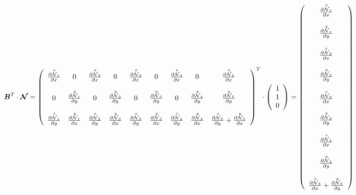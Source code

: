 \[
{\bm B}^T \cdot {\bm {{\mathcal{N}}}} 
=
\left(
\begin{array}{cccccccccccccccccc}
\frac{\partial \overset{x}{{\mathcal{N}}}_1}{\partial x} & 0 &
\frac{\partial \overset{x}{{\mathcal{N}}}_2}{\partial x} & 0 &
\frac{\partial \overset{x}{{\mathcal{N}}}_3}{\partial x} & 0 &
\frac{\partial \overset{x}{{\mathcal{N}}}_4}{\partial x} & 0 &
\frac{\partial \overset{x}{{\mathcal{N}}}_5}{\partial x} 
\\ \\
0 & \frac{\partial \overset{\tiny y}{{\mathcal{N}}}_1}{\partial y} & 
0 & \frac{\partial \overset{\tiny y}{{\mathcal{N}}}_2}{\partial y} & 
0 & \frac{\partial \overset{\tiny y}{{\mathcal{N}}}_3}{\partial y} & 
0 & \frac{\partial \overset{\tiny y}{{\mathcal{N}}}_4}{\partial y} & 
\frac{\partial \overset{\tiny y}{{\mathcal{N}}}_5}{\partial y} 
\\ \\ 
\frac{\partial \overset{\tiny x}{{\mathcal{N}}}_1}{\partial y} &  
\frac{\partial \overset{\tiny y}{{\mathcal{N}}}_1}{\partial x} &  
\frac{\partial \overset{\tiny x}{{\mathcal{N}}}_2}{\partial y} &  
\frac{\partial \overset{\tiny y}{{\mathcal{N}}}_2}{\partial x} &  
\frac{\partial \overset{\tiny x}{{\mathcal{N}}}_3}{\partial y} &  
\frac{\partial \overset{\tiny y}{{\mathcal{N}}}_3}{\partial x} &  
\frac{\partial \overset{\tiny x}{{\mathcal{N}}}_4}{\partial y} &  
\frac{\partial \overset{\tiny y}{{\mathcal{N}}}_4}{\partial x} &  
\frac{\partial \overset{\tiny x}{{\mathcal{N}}}_5}{\partial y} + 
\frac{\partial \overset{\tiny y}{{\mathcal{N}}}_5}{\partial x} 
\end{array}
\right)^T 
\cdot \left(
\begin{array}{c}
1 \\ 1 \\ 0
\end{array}
\right)
=
\left(
\begin{array}{c}
\frac{\partial \overset{x}{{\mathcal{N}}}_1}{\partial x} \\ \\
\frac{\partial \overset{y}{{\mathcal{N}}}_1}{\partial y} \\ \\
\frac{\partial \overset{x}{{\mathcal{N}}}_2}{\partial x} \\ \\
\frac{\partial \overset{y}{{\mathcal{N}}}_2}{\partial y} \\ \\
\frac{\partial \overset{x}{{\mathcal{N}}}_3}{\partial x} \\ \\
\frac{\partial \overset{y}{{\mathcal{N}}}_3}{\partial y} \\ \\
\frac{\partial \overset{x}{{\mathcal{N}}}_4}{\partial x} \\ \\
\frac{\partial \overset{y}{{\mathcal{N}}}_4}{\partial y} \\ \\
\frac{\partial \overset{x}{{\mathcal{N}}}_5}{\partial x} + 
\frac{\partial \overset{y}{{\mathcal{N}}}_5}{\partial y} 
\end{array}
\right)
\]


